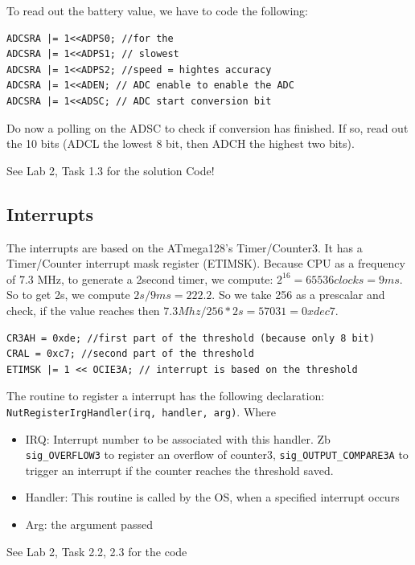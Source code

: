 To read out the battery value, we have to code the following: 

\begin{lstlisting}[basicstyle=\small]
ADCSRA |= 1<<ADPS0; //for the
ADCSRA |= 1<<ADPS1; // slowest
ADCSRA |= 1<<ADPS2; //speed = hightes accuracy
ADCSRA |= 1<<ADEN; // ADC enable to enable the ADC
ADCSRA |= 1<<ADSC; // ADC start conversion bit 
\end{lstlisting}

Do now a polling on the ADSC to check if conversion has finished. If so, read out the 10 bits (ADCL the lowest 8 bit, then ADCH the highest two bits).

\begin{tnote}
See Lab 2, Task 1.3 for the solution Code!
\end{tnote}

\subsection{Interrupts}
The interrupts are based on the ATmega128's Timer/Counter3. It has a Timer/Counter interrupt mask register (ETIMSK).
Because CPU as a frequency of 7.3 MHz, to generate a 2second timer, we compute: $2^{16} = 65536 clocks = 9ms$. So to get 2s, we compute $2s/9ms = 222.2$. So we take 256 as a prescalar and check, if the value reaches then $7.3Mhz/256*2s = 57031 = 0xdec7$.

\begin{lstlisting}[basicstyle=\small]
CR3AH = 0xde; //first part of the threshold (because only 8 bit)
CRAL = 0xc7; //second part of the threshold
ETIMSK |= 1 << OCIE3A; // interrupt is based on the threshold
\end{lstlisting}

The routine to register a interrupt has the following declaration: \texttt{NutRegisterIrgHandler(irq, handler, arg)}. Where
\begin{itemize}[noitemsep]
\item IRQ: Interrupt number to be associated with this handler. Zb \texttt{ sig\_OVERFLOW3} to register an overflow of counter3, \texttt {sig\_OUTPUT\_COMPARE3A} to trigger an interrupt if the counter reaches the threshold saved.
\item Handler: This routine is called by the OS, when a specified interrupt occurs
\item Arg: the argument passed
\end{itemize}

\begin{tnote}
See Lab 2, Task 2.2, 2.3 for the code
\end{tnote}


